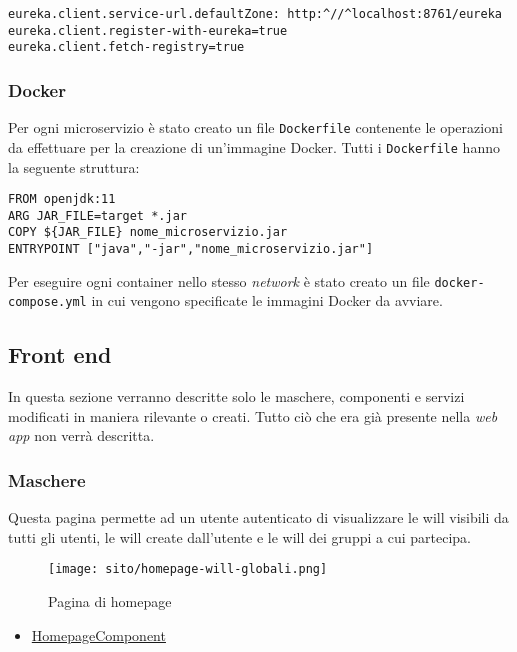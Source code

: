 \begin{lstlisting}[style=Docker, caption = {Configurazione per la registrazione di un microservizio all'\texttt{Eureka Server} nel file \texttt{application.properties}}]
eureka.client.service-url.defaultZone: http:^//^localhost:8761/eureka
eureka.client.register-with-eureka=true
eureka.client.fetch-registry=true
\end{lstlisting}

\subsubsection{Docker}
Per ogni \gls{microservizio} è stato creato un file \texttt{Dockerfile} contenente le operazioni da effettuare per la creazione di un'immagine Docker.
Tutti i \texttt{Dockerfile} hanno la seguente struttura:

\begin{lstlisting}[style=Docker]
FROM openjdk:11
ARG JAR_FILE=target *.jar
COPY ${JAR_FILE} nome_microservizio.jar
ENTRYPOINT ["java","-jar","nome_microservizio.jar"]
\end{lstlisting}


Per eseguire ogni \gls{container} nello stesso \textit{network} è stato creato un file \texttt{docker-compose.yml} in cui vengono specificate le immagini Docker da avviare. 
\subsection{Front end}
In questa sezione verranno descritte solo le maschere, componenti e servizi modificati in maniera rilevante o creati. Tutto ciò che era già presente nella \textit{web app} non verrà descritta.
\subsubsection{Maschere}
Questa pagina permette ad un utente autenticato di visualizzare le \gls{will} visibili da tutti gli utenti, le \gls{will} create dall'utente e le \gls{will} dei gruppi a cui partecipa.
\begin{figure}[H] 
    \centering 
    \texttt{[image: sito/homepage-will-globali.png]} 
    \caption{Pagina di homepage}
\end{figure}
\begin{itemize}
    \item \hyperref[par:HomepageComponent]{HomepageComponent}
\end{itemize}

